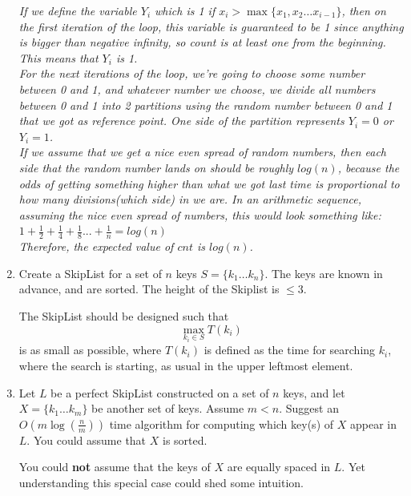 \documentclass[11pt,epic,leqno,eepic,psfig,]{article}
\newcommand{\ans}[1]{{\color{brown}{\bf\Large Answer:} \sl  #1 \color{black}}}
\renewcommand{\i}{\item}
\begin{document}
\begin{enumerate}
\ans{If we define the variable $Y_i$ which is 1 if $x_i > \max\{x_1, x_2\dots x_{i-1}\} $, then on the first iteration of the loop, this variable is guaranteed to be 1 since anything is bigger than negative infinity, so count is at least one from the beginning. This means that $Y_i$ is 1.
\\ For the next iterations of the loop, we're going to choose some number between 0 and 1, and whatever number we choose, we divide all numbers between 0 and 1 into 2 partitions using the random number between 0 and 1 that we got as reference point. One side of the partition represents $Y_i = 0$ or $Y_i = 1$.
\\ If we assume that we get a nice even spread of random numbers, then each side that the random number lands on should be roughly $log(n)$, because the odds of getting something higher than what we got last time is proportional to how many divisions(which side) in we are. In an arithmetic sequence, assuming the nice even spread of numbers, this would look something like: 
\\ $1 + \frac{1}{2} + \frac{1}{4} +\frac{1}{8}...+ \frac{1}{n} = log(n)$ 
\\ Therefore, the expected value of $cnt$ is $log(n)$. }





\i  Create a SkipList for a set of $n$ keys
$S=\{k_1\dots k_n\}$.
The keys are known in advance, and are sorted. The height of the Skiplist is $\leq 3$.

The SkipList should be designed such that $$\max_{k_i\in S} T(k_i) $$ is as small as possible, where $T(k_i)$ is defined as the time for searching $k_i$, where the search is starting, as usual in the upper leftmost element.





\i Let $L$ be a perfect SkipList constructed on a set of $n$ keys, and let $X=\{k_1\dots k_m\}$ be another  set of keys. Assume $m<n$.  Suggest an $O(m\log({\frac {n }{m}}))$ time  algorithm for computing which key(s) of $X$  appear in $L$.  {\color{brown} You could assume that $X$ is sorted}.



You could {\bf not } assume that the keys of $X$ are equally spaced in $L$. Yet understanding this special case could shed some intuition.

\end{enumerate}
\end{document}
